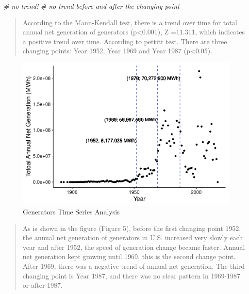 \documentclass[12pt,]{article}
\newenvironment{Shaded}{\begin{snugshade}}{\end{snugshade}}
\newcommand{\CommentTok}[1]{\textcolor[rgb]{0.56,0.35,0.01}{\textit{#1}}}
\begin{document}
\begin{Shaded}
\begin{Highlighting}[]
\CommentTok{# no trend!}
\CommentTok{# no trend before and after the changing point}
\end{Highlighting}
\end{Shaded}

\begin{quote}
According to the Mann-Kendall test, there is a trend over time for total
annual net generation of generators (p\textless{}0.001), Z =11.311,
which indicates a positive trend over time. According to pettitt test.
There are three changing points: Year 1952, Year 1969 and Year 1987
(p\textless{}0.05).
\end{quote}

\begin{figure}
\centering
\includegraphics{Zhang_X_ENV872_Project_files/figure-latex/unnamed-chunk-8-1.pdf}
\caption{Generators Time Series Analysis}
\end{figure}

\begin{quote}
As is shown in the figure (Figure 5), before the first changing point
1952, the annual net generation of generators in U.S. increased very
slowly each year and after 1952, the speed of generation change became
faster. Annual net generation kept growing until 1969, this is the
second change point. After 1969, there was a negative trend of annual
net generation. The third changing point is Year 1987, and there was no
clear pattern in 1969-1987 or after 1987.
\end{quote}
\end{document}
